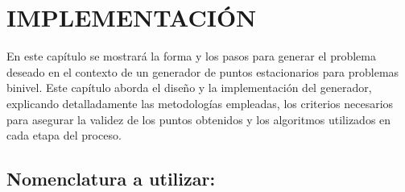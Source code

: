 \chapter{IMPLEMENTACIÓN}

En este capítulo se mostrará la forma y los pasos para generar el problema deseado en el contexto de un generador de puntos estacionarios para problemas binivel. Este capítulo aborda el diseño y la implementación del generador, explicando detalladamente las metodologías empleadas, los criterios necesarios para asegurar la validez de los puntos obtenidos y los algoritmos utilizados en cada etapa del proceso.

\section{Nomenclatura a utilizar:}
